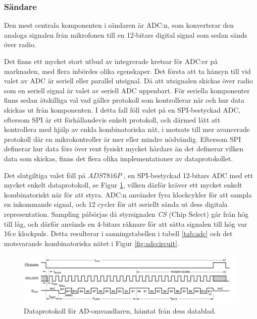 \documentclass[a4paper,10pt]{article}
\begin{document}
\subsubsection{Sändare}

Den mest centrala komponenten i sändaren är ADC:n, som konverterar den analoga
signalen från mikrofonen till en 12-bitars digital signal som sedan sänds över
radio.

Det finns ett mycket stort utbud av integrerade kretsar för ADC:er på marknaden,
med flera inbördes olika egenskaper. Det första att ta hänsyn till vid valet av
ADC är seriell eller parallel utsignal. Då att utsignalen skickas över 
radio som en seriell signal är valet av seriell ADC uppenbart. För seriella 
komponenter finns sedan åtskilliga val vad gäller protokoll som kontrollerar när
och hur data skickas ut från komponenten. I detta fall föll valet på en 
SPI-bestyckad ADC, eftersom SPI är ett förhållandevis enkelt protokoll, och
därmed lätt att kontrollera med hjälp av enkla kombinatoriska nät, i motsats 
till mer avancerade protokoll där en mikrokontroller är mer eller mindre
nödvändig. Eftersom SPI definerar hur data förs över rent fysiskt mycket
hårdare än det definerar vilken data som skickas, finns det flera olika 
implementationer av dataprotokollet.

Det slutgiltiga valet föll på $ADS7816P$ \cite{adc}, en SPI-bestyckad 12-bitars 
ADC med ett mycket enkelt dataprotokoll, se Figur \ref{fig:adcproto}, vilken 
därför kräver ett mycket enkelt kombinatoriskt när för att styra. ADC:n använder 
fyra klockcykler för att sampla en inkommande signal, och 12 cycler för att
seriellt sända ut dess digitala representation. Sampling påbörjas då 
styrsignalen \emph{CS} (Chip Select) går från hög till låg, och därför används
en 4-bitars räknare för att sätta signalen till hög var 16:e klockpuls. Detta 
resulterar i sanningstabellen i tabell \ref{tab:adc} och det motsvarande 
kombinatoriska nätet i Figur \ref{fig:adccircuit}.

\begin{figure}[h]
\centering
\includegraphics[width=\textwidth]{adcdiagram.png}
\caption{Dataprotokoll för AD-omvandlaren, hämtat från dess datablad.}
\label{fig:adcproto}
\end{figure}
\end{document}
